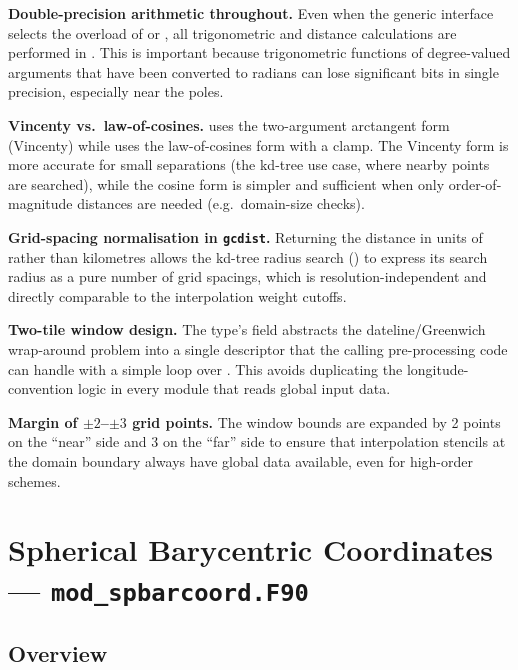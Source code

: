 \textbf{Double-precision arithmetic throughout.} Even when the generic
interface selects the  overload of  or
, all trigonometric and distance calculations are performed
in . This is important because trigonometric functions of
degree-valued arguments that have been converted to radians can lose
significant bits in single precision, especially near the poles.

\textbf{Vincenty vs.\ law-of-cosines.}  uses the two-argument
arctangent form (Vincenty) while  uses the law-of-cosines
form with a clamp. The Vincenty form is more accurate for small separations
(the kd-tree use case, where nearby points are searched), while the cosine
form is simpler and sufficient when only order-of-magnitude distances are
needed (e.g.\ domain-size checks).

\textbf{Grid-spacing normalisation in \texttt{gcdist}.} Returning the
distance in units of  rather than kilometres allows the kd-tree
radius search () to express its search radius as a pure
number of grid spacings, which is resolution-independent and directly
comparable to the interpolation weight cutoffs.

\textbf{Two-tile window design.} The  type's
 field abstracts the dateline/Greenwich wrap-around problem
into a single descriptor that the calling pre-processing code can handle
with a simple loop over . This avoids duplicating the
longitude-convention logic in every module that reads global input data.

\textbf{Margin of $\pm2$--$\pm3$ grid points.} The window bounds are
expanded by 2 points on the ``near'' side and 3 on the ``far'' side to
ensure that interpolation stencils at the domain boundary always have
global data available, even for high-order schemes.

\section{Spherical Barycentric Coordinates --- \texttt{mod\_spbarcoord.F90}}
\label{sec:spbarcoord}

\subsection{Overview}

